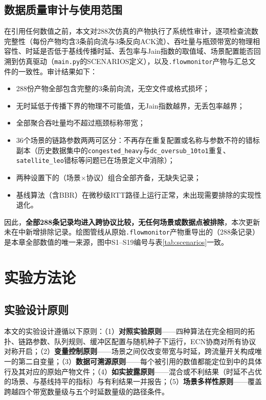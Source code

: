 \subsection{数据质量审计与使用范围}
\label{subsec:audit}

在引用任何数值之前，本文对288次仿真的产物执行了系统性审计，逐项检查流数完整性（每份产物均含3条前向流与3条反向ACK流）、吞吐量与瓶颈带宽的物理相容性、时延是否低于基线传播时延、丢包率与Jain指数的取值域、场景配置能否回溯到仿真驱动（\texttt{main.py}的SCENARIOS定义），以及\texttt{.flowmonitor}产物与汇总文件的一致性。审计结果如下：

\begin{itemize}
\item 288份产物全部包含完整的3条前向流，无空文件或格式损坏；
\item 无时延低于传播下界的物理不可能值，无Jain指数越界，无丢包率越界；
\item 全部聚合吞吐量均不超过瓶颈标称带宽；
\item 36个场景的链路参数两两可区分：不再存在重复配置或名称与参数不符的错标副本（历史数据集中的\texttt{congested\_heavy}与\texttt{dc\_oversub\_10to1}重复、\texttt{satellite\_leo}错标等问题已在场景定义中消除）；
\item 两种设置下的（场景$\times$协议）组合全部齐备，无缺失记录；
\item 基线算法（含BBR）在微秒级RTT路径上运行正常，未出现需要排除的实现性退化。
\end{itemize}

因此，\textbf{全部288条记录均进入跨协议比较，无任何场景或数据点被排除}，本次更新未在中新增排除记录。绘图管线从原始\texttt{.flowmonitor}产物重导出的（288条记录）是本章全部数值的唯一来源，图中S1--S19编号与表\ref{tab:scenarios}一致。

\section{实验方法论}

\subsection{实验设计原则}

本文的实验设计遵循以下原则：（1）\textbf{对照实验原则}——四种算法在完全相同的拓扑、链路参数、队列规则、缓冲区配置与随机种子下运行，ECN协商对所有协议对称开启；（2）\textbf{变量控制原则}——场景之间仅改变带宽与时延，跨流量开关构成唯一的第二自变量；（3）\textbf{数据可溯源原则}——每个被引用的数值都能定位到中的具体行及其对应的原始产物文件；（4）\textbf{如实披露原则}——混合或不利结果（时延不占优的场景、与基线持平的指标）与有利结果一并报告；（5）\textbf{场景多样性原则}——覆盖跨越四个带宽数量级与五个时延数量级的路径条件。

